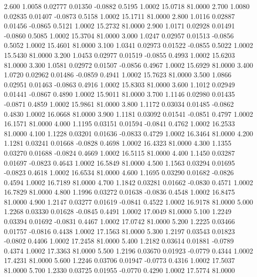    2.600   1.0058   0.02777   0.01350  -0.0882   0.5195   1.0002  15.0718  81.0000
   2.700   1.0080   0.02835   0.01407  -0.0873   0.5158   1.0002  15.1711  81.0000
   2.800   1.0116   0.02887   0.01456  -0.0865   0.5121   1.0002  15.2732  81.0000
   2.900   1.0171   0.02928   0.01491  -0.0860   0.5085   1.0002  15.3704  81.0000
   3.000   1.0247   0.02957   0.01513  -0.0856   0.5052   1.0002  15.4601  81.0000
   3.100   1.0341   0.02973   0.01522  -0.0855   0.5022   1.0002  15.5430  81.0000
   3.200   1.0453   0.02977   0.01519  -0.0855   0.4993   1.0002  15.6203  81.0000
   3.300   1.0581   0.02972   0.01507  -0.0856   0.4967   1.0002  15.6929  81.0000
   3.400   1.0720   0.02962   0.01486  -0.0859   0.4941   1.0002  15.7623  81.0000
   3.500   1.0866   0.02951   0.01463  -0.0863   0.4916   1.0002  15.8303  81.0000
   3.600   1.1012   0.02949   0.01441  -0.0867   0.4890   1.0002  15.9011  81.0000
   3.700   1.1146   0.02980   0.01435  -0.0871   0.4859   1.0002  15.9861  81.0000
   3.800   1.1172   0.03034   0.01485  -0.0862   0.4830   1.0002  16.0668  81.0000
   3.900   1.1181   0.03092   0.01541  -0.0851   0.4797   1.0002  16.1571  81.0000
   4.000   1.1195   0.03151   0.01594  -0.0841   0.4762   1.0002  16.2533  81.0000
   4.100   1.1228   0.03201   0.01636  -0.0833   0.4729   1.0002  16.3464  81.0000
   4.200   1.1281   0.03241   0.01668  -0.0828   0.4698   1.0002  16.4323  81.0000
   4.300   1.1355   0.03270   0.01688  -0.0824   0.4669   1.0002  16.5115  81.0000
   4.400   1.1450   0.03287   0.01697  -0.0823   0.4643   1.0002  16.5849  81.0000
   4.500   1.1563   0.03294   0.01695  -0.0823   0.4618   1.0002  16.6534  81.0000
   4.600   1.1695   0.03290   0.01682  -0.0826   0.4594   1.0002  16.7189  81.0000
   4.700   1.1842   0.03281   0.01662  -0.0830   0.4571   1.0002  16.7829  81.0000
   4.800   1.1996   0.03272   0.01638  -0.0836   0.4548   1.0002  16.8475  81.0000
   4.900   1.2147   0.03277   0.01619  -0.0841   0.4522   1.0002  16.9178  81.0000
   5.000   1.2268   0.03330   0.01628  -0.0845   0.4491   1.0002  17.0049  81.0000
   5.100   1.2249   0.03394   0.01692  -0.0831   0.4467   1.0002  17.0742  81.0000
   5.200   1.2225   0.03466   0.01757  -0.0816   0.4438   1.0002  17.1563  81.0000
   5.300   1.2197   0.03543   0.01823  -0.0802   0.4406   1.0002  17.2458  81.0000
   5.400   1.2182   0.03614   0.01881  -0.0789   0.4374   1.0002  17.3363  81.0000
   5.500   1.2196   0.03670   0.01923  -0.0779   0.4344   1.0002  17.4231  81.0000
   5.600   1.2246   0.03706   0.01947  -0.0773   0.4316   1.0002  17.5037  81.0000
   5.700   1.2330   0.03725   0.01955  -0.0770   0.4290   1.0002  17.5774  81.0000

